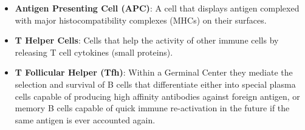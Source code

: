\documentclass[english]{article}
\begin{document}
\begin{itemize}
\item \textbf{Antigen Presenting Cell (APC)}: A cell that displays antigen complexed with major histocompatibility complexes (MHCs) on their surfaces.

\item \textbf{T Helper Cells}: Cells that help the activity of other immune cells by releasing T cell cytokines (small proteins).

\item \textbf{T Follicular Helper (Tfh)}: Within a Germinal Center they mediate the selection and survival of B cells that differentiate either into special plasma cells capable of producing high affinity antibodies against foreign antigen, or memory B cells capable of quick immune re-activation in the future if the same antigen is ever accounted again. 


\end{itemize}
\end{document}
